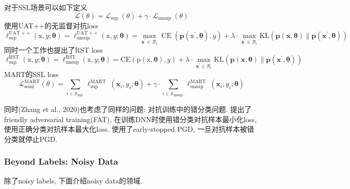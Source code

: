 \documentclass{article}
\begin{document}
{    对于SSL场景可以如下定义
    \begin{equation}
        \mathcal{L}(\theta)=\mathcal{L}_{\text {sup }}(\theta)+\gamma \cdot \mathcal{L}_{\text {unsup }}(\theta)
    \end{equation}
    使用UAT++的无监督对抗loss
    \begin{equation}
        \ell_{\text {sup }}^{\mathrm{UAT}++}(\mathrm{x}, y ; \boldsymbol{\theta})=\ell_{\mathrm{unsup}}^{\mathrm{UAT}++}(\mathrm{x}, y ; \boldsymbol{\theta})=\max _{\mathbf{x}^{\prime} \in \mathcal{B}_{\epsilon}} \operatorname{CE}\left(\mathbf{p}\left(\mathrm{x}^{\prime}, \boldsymbol{\theta}\right), y\right)+\lambda \cdot \max _{\mathbf{x}^{\prime} \in \mathcal{B}_{\epsilon}} \mathrm{KL}\left(\mathbf{p}(\mathbf{x}, \boldsymbol{\theta}) \| \mathbf{p}\left(\mathbf{x}^{\prime}, \boldsymbol{\theta}\right)\right)
    \end{equation}
    同时一个工作也提出了RST loss
    \begin{equation}
        \ell_{\mathrm{sup}}^{\mathrm{RST}}(\mathrm{x}, y ; \boldsymbol{\theta})=\ell_{\mathrm{unsup}}^{\mathrm{RST}}(\mathrm{x}, y ; \boldsymbol{\theta})=\mathrm{CE}(\mathrm{p}(\mathrm{x}, \boldsymbol{\theta}), y)+\lambda \cdot \max _{\mathbf{x}^{\prime} \in \mathcal{B}_{\epsilon}} \mathrm{KL}\left(\mathbf{p}(\mathbf{x}, \boldsymbol{\theta}) \| \mathbf{p}\left(\mathbf{x}^{\prime}, \boldsymbol{\theta}\right)\right)
    \end{equation}
    MART的SSL loss
    \begin{equation}
        \mathcal{L}_{\mathrm{semi}}^{\operatorname{MART}}(\theta)=\sum_{i \in \mathcal{S}_{\text {sup }}} \ell_{\text {sup }}^{\text {MART }}\left(\mathbf{x}_{i}, y_{i} ; \boldsymbol{\theta}\right)+\gamma \cdot \sum_{i \in \mathcal{S}_{\text {unsup }}} \ell_{\text {unsup }}^{\text {MART }}\left(\mathbf{x}_{i}, y_{i} ; \boldsymbol{\theta}\right)
    \end{equation}
}

同时(Zhang et al., 2020)也考虑了同样的问题: 对抗训练中的错分类问题. 提出了friendly adversarial training(FAT), 在训练DNN时使用错分类对抗样本最小化loss, 使用正确分类对抗样本最大化loss. 使用了early-stopped PGD, 一旦对抗样本被错分类就停止PGD.

\subsubsection{Beyond Labels: Noisy Data}

除了noisy labels, 下面介绍noisy data的领域.
\end{document}
